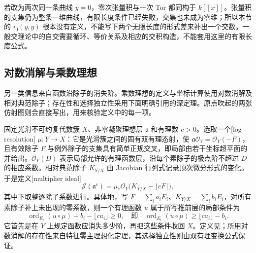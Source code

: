若改为两次同一条曲线 \(y=0\)，零次张量积与一次 Tor 都同构于 \(k[\![x]\!]\)。张量积的支集仍为整条一维曲线，有限长度条件已经失败，交集也未成为零维；所以本节的 \(i_0(y,y)\) 根本没有定义，不能写下两个无限长度的形式差来补出一个交数。一般交理论中的自交需要循环、等价关系及相应的交积构造，不能套用这里的有限长度公式。

\subsection{对数消解与乘数理想}
\label{b3:subsec:C04:02}

另一类信息来自函数沿除子的消失阶。乘数理想的定义与坐标计算使用对数消解及相对典范除子；存在性和选择独立性采用下面明确引用的深定理。原点吹起的两张仿射图则会直接写出，用来核验定义中的每一项。

\ProseParagraphBreak
固定光滑不可约复代数簇 \(X\)、非零凝聚理想层 \(\mathfrak a\) 和有理数 \(c>0\)。选取一个[log resolution] \(\mu:Y\to X\)：它是光滑簇之间的固有双有理态射，使 \(\mathfrak a\mathcal O_Y=\mathcal O_Y(-F)\)，且有效除子 \(F\) 与例外除子的支集具有简单正规交叉，即局部由若干坐标超平面的并给出。\(\mathcal O_Y(D)\) 表示局部允许的有理函数层，沿每个素除子的极点阶不超过 \(D\) 的相应系数。相对典范除子 \(K_{Y/X}\) 由 Jacobian 行列式记录顶次微分形式的变化。于是定义[multiplier ideal]
\[
	\mathcal J(\mathfrak a^c) =\mu_*\mathcal O_Y\bigl(K_{Y/X}-\lfloor cF\rfloor\bigr),
\]
其中下取整逐除子系数进行。具体地，写 \(F=\sum_i a_iE_i\)、\(K_{Y/X}=\sum_i b_iE_i\)，对所有素除子补上未出现的零系数，则一个有理函数 \(u\) 属于所写推前层的局部条件为
\[
	\operatorname{ord}_{E_i}(u\circ\mu)+b_i-\lfloor ca_i\rfloor\ge0, \quad\text{即}\quad \operatorname{ord}_{E_i}(u\circ\mu)\ge\lfloor ca_i\rfloor-b_i.
\]
它首先是在 \(Y\) 上规定函数应消失多少阶，再把这些条件收回 \(X\)。定义见\cite[Lecture 1, Definition 1.3]{Lazarsfeld2010ShortCourse}；所用对数消解的存在性来自特征零主理想化定理，其选择独立性则由双有理变换公式保证。

